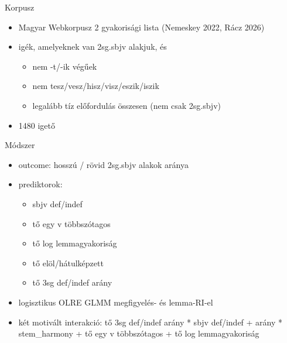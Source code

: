 \begin{frame}{Korpusz}
\protect{}\label{korpusz}
\begin{itemize}
\tightlist
\item
  Magyar Webkorpusz 2 gyakorisági lista (Nemeskey 2022, Rácz 2026)
\item
  igék, amelyeknek van 2sg.sbjv alakjuk, és

  \begin{itemize}
  \tightlist
  \item
    nem -t/-ik végűek
  \item
    nem tesz/vesz/hisz/visz/eszik/iszik
  \item
    legalább tíz előfordulás összesen (nem csak 2sg.sbjv)
  \end{itemize}
\item
  1480 igető
\end{itemize}
\end{frame}

\begin{frame}{Módszer}
\protect{}\label{muxf3dszer}
\begin{itemize}
\tightlist
\item
  outcome: hosszú / rövid 2sg.sbjv alakok aránya
\item
  prediktorok:

  \begin{itemize}
  \tightlist
  \item
    sbjv def/indef
  \item
    tő egy v többszótagos
  \item
    tő log lemmagyakoriság
  \item
    tő elöl/hátulképzett
  \item
    tő 3sg def/indef arány
  \end{itemize}
\item
  logisztikus OLRE GLMM megfigyelés- és lemma-RI-el
\item
  két motivált interakció: tő 3sg def/indef arány * sbjv def/indef +
  arány * stem\_harmony + tő egy v többszótagos + tő log lemmagyakoriság
\end{itemize}
\end{frame}


